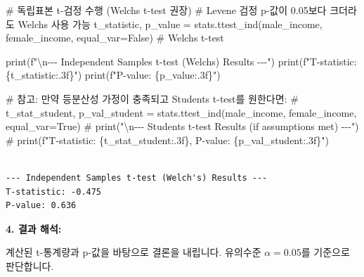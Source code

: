 \documentclass[
  letterpaper,
]{book}
\newenvironment{Shaded}{\begin{snugshade}}{\end{snugshade}}
\newcommand{\BuiltInTok}[1]{\textcolor[rgb]{0.00,0.23,0.31}{#1}}
\newcommand{\CharTok}[1]{\textcolor[rgb]{0.13,0.47,0.30}{#1}}
\newcommand{\CommentTok}[1]{\textcolor[rgb]{0.37,0.37,0.37}{#1}}
\newcommand{\NormalTok}[1]{\textcolor[rgb]{0.00,0.23,0.31}{#1}}
\newcommand{\OperatorTok}[1]{\textcolor[rgb]{0.37,0.37,0.37}{#1}}
\newcommand{\SpecialCharTok}[1]{\textcolor[rgb]{0.37,0.37,0.37}{#1}}
\newcommand{\SpecialStringTok}[1]{\textcolor[rgb]{0.13,0.47,0.30}{#1}}
\newcommand{\VariableTok}[1]{\textcolor[rgb]{0.07,0.07,0.07}{#1}}
\begin{document}
\begin{Shaded}
\begin{Highlighting}[]
\CommentTok{\# 독립표본 t{-}검정 수행 (Welch\textquotesingle{}s t{-}test 권장)}
\CommentTok{\# Levene 검정 p{-}값이 0.05보다 크더라도 Welch\textquotesingle{}s 사용 가능}
\NormalTok{t\_statistic, p\_value }\OperatorTok{=}\NormalTok{ stats.ttest\_ind(male\_income, female\_income, equal\_var}\OperatorTok{=}\VariableTok{False}\NormalTok{) }\CommentTok{\# Welch\textquotesingle{}s t{-}test}

\BuiltInTok{print}\NormalTok{(}\SpecialStringTok{f"}\CharTok{\textbackslash{}n}\SpecialStringTok{{-}{-}{-} Independent Samples t{-}test (Welch\textquotesingle{}s) Results {-}{-}{-}"}\NormalTok{)}
\BuiltInTok{print}\NormalTok{(}\SpecialStringTok{f"T{-}statistic: }\SpecialCharTok{\{}\NormalTok{t\_statistic}\SpecialCharTok{:.3f\}}\SpecialStringTok{"}\NormalTok{)}
\BuiltInTok{print}\NormalTok{(}\SpecialStringTok{f"P{-}value: }\SpecialCharTok{\{}\NormalTok{p\_value}\SpecialCharTok{:.3f\}}\SpecialStringTok{"}\NormalTok{)}

\CommentTok{\# 참고: 만약 등분산성 가정이 충족되고 Student\textquotesingle{}s t{-}test를 원한다면:}
\CommentTok{\# t\_stat\_student, p\_val\_student = stats.ttest\_ind(male\_income, female\_income, equal\_var=True)}
\CommentTok{\# print("\textbackslash{}n{-}{-}{-} Student\textquotesingle{}s t{-}test Results (if assumptions met) {-}{-}{-}")}
\CommentTok{\# print(f"T{-}statistic: \{t\_stat\_student:.3f\}, P{-}value: \{p\_val\_student:.3f\}")}
\end{Highlighting}
\end{Shaded}

\begin{verbatim}

--- Independent Samples t-test (Welch's) Results ---
T-statistic: -0.475
P-value: 0.636
\end{verbatim}

\textbf{4. 결과 해석:}

계산된 t-통계량과 p-값을 바탕으로 결론을 내립니다. 유의수준
\(\alpha = 0.05\)를 기준으로 판단합니다.
\end{document}
